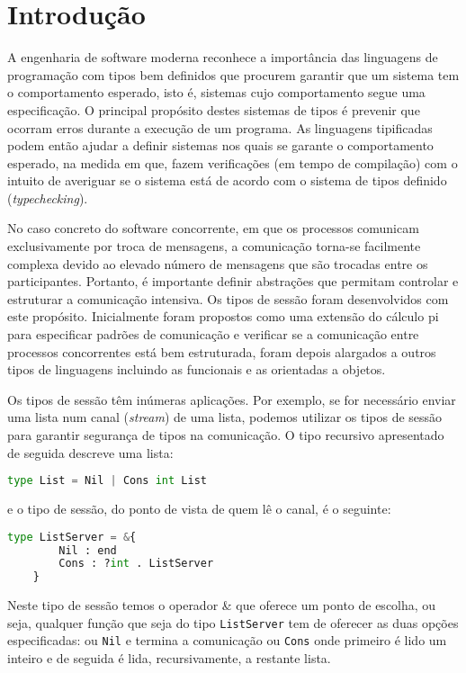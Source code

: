 
\section{Introdução}
\label{sec:intro}

A engenharia de software moderna reconhece a importância das linguagens de programação com tipos bem definidos que procurem garantir que um sistema tem o comportamento esperado, isto é, sistemas cujo comportamento segue uma especificação. O principal propósito destes sistemas de tipos é prevenir que ocorram erros durante a execução de um programa. As linguagens tipificadas podem então ajudar a definir sistemas nos quais se garante o comportamento esperado, na medida em que, fazem verificações (em tempo de compilação) com o intuito de averiguar se o sistema está de acordo com o sistema de tipos definido (\textit{typechecking}).

No caso concreto do software concorrente, em que os processos comunicam exclusivamente por troca de mensagens, a comunicação torna-se facilmente complexa devido ao elevado número de mensagens que são trocadas entre os participantes. Portanto, é importante definir abstrações que permitam controlar e estruturar a comunicação intensiva. Os tipos de sessão foram desenvolvidos com este propósito.
Inicialmente foram propostos como uma extensão do cálculo pi para especificar padrões de comunicação e verificar se a comunicação entre processos concorrentes está bem estruturada, foram depois alargados a outros tipos de linguagens incluindo as funcionais e as orientadas a objetos.

Os tipos de sessão têm inúmeras aplicações. Por exemplo, se for necessário enviar uma lista num canal (\textit{stream}) de uma lista, podemos utilizar os tipos de sessão para garantir segurança de tipos na comunicação. O tipo recursivo apresentado de seguida descreve uma lista:
\begin{lstlisting}[language=Python]
	type List = Nil | Cons int List
\end{lstlisting}
e o tipo de sessão, do ponto de vista de quem lê o canal, é o seguinte:
\begin{lstlisting}[language=Python]
	type ListServer = &{
		Nil : end
		Cons : ?int . ListServer
	}
\end{lstlisting}

Neste tipo de sessão temos o operador \& que oferece um ponto de escolha, ou seja, qualquer função que seja do tipo \lstinline"ListServer" tem de oferecer as duas opções especificadas: ou \lstinline"Nil" e termina a comunicação ou \lstinline"Cons" onde primeiro é lido um inteiro e de seguida é lida, recursivamente, a restante lista.

